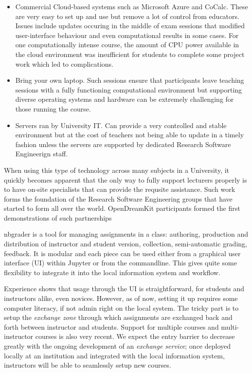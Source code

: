 \documentclass{deliverablereport}
\begin{document}
\begin{itemize}
\tightlist
\item
  Commercial Cloud-based systems such as Microsoft Azure and CoCalc.
  These are very easy to set up and use but remove a lot of control from
  educators. Issues include updates occuring in the middle of exam
  sessions that modified user-interface behaviour and even computational
  results in some cases. For one computationally intense course, the
  amount of CPU power available in the cloud environment was
  insufficient for students to complete some project work which led to
  complications.
\item
  Bring your own laptop. Such sessions ensure that participants leave
  teaching sessions with a fully functioning computational environment
  but supporting diverse operating systems and hardware can be extremely
  challenging for those running the course.
\item
  Servers ran by University IT. Can provide a very controlled and stable
  environment but at the cost of teachers not being able to update in a
  timely fashion unless the servers are supported by dedicated Research
  Software Engineerign staff.
\end{itemize}

When using this type of technology across many subjects in a University,
it quickly becomes apparent that the only way to fully support lecturers
properly is to have on-site specialists that can provide the requsite
assistance. Such work forms the foundation of the Research Software
Engineering groups that have started to form all over the world.
OpenDreamKit participants formed the first demonstrations of such
partnerships

nbgrader is a tool for managing assignments in a class: authoring,
production and distribution of instructor and student version,
collection, semi-automatic grading, feedback. It is modular and each
piece can be used either from a graphical user interface (UI) within
Jupyter or from the commandline. This gives quite some flexibility to
integrate it into the local information system and workflow.

Experience shows that usage through the UI is straightforward, for
students and instructors alike, even novices. However, as of now,
setting it up requires some computer literacy, if not admin right on the
local system. The tricky part is to setup the \emph{exchange zone}
through which assignments are exchanged back and forth between
instructor and students. Support for multiple courses and
multi-instructor courses is also very recent. We expect the entry
barrier to decrease greatly with the ongoing development of an
\emph{exchange service}; once deployed locally at an institution and
integrated with the local information system, instructors will be able
to seamlessly setup new courses.
\end{document}

